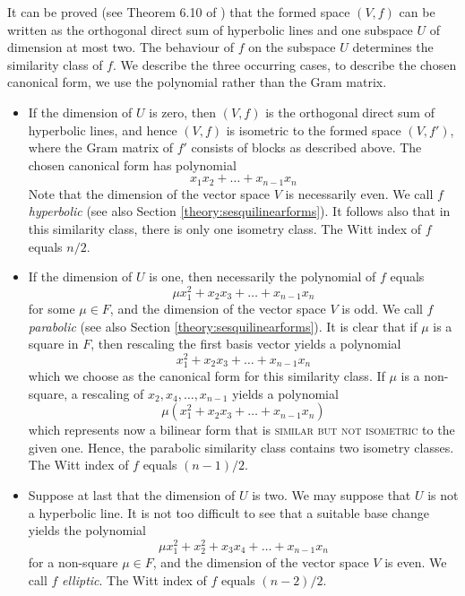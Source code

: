 \documentclass[a4paper,11pt]{report}
\begin{document}
{{{ It can be proved (see Theorem 6.10 of \cite{Cameron}) that the formed space $(V,f)$ can be written as the orthogonal direct sum of hyperbolic lines and one
subspace $U$ of dimension at most two. The behaviour of $f$ on the subspace $U$ determines the similarity class of $f$. We describe the three occurring cases, to describe the chosen canonical
form, we use the polynomial rather than the Gram matrix. 

 
\begin{itemize}
\item If the dimension of $U$ is zero, then $(V,f)$ is the orthogonal direct sum of hyperbolic lines, and hence $(V,f)$ is isometric to the formed space $(V,f')$, where the Gram matrix of $f'$ consists of blocks as described above. The chosen canonical form has
polynomial 
\[ x_1 x_2 + \ldots + x_{n-1}x_n \]
  Note that the dimension of the vector space $V$ is necessarily even. We call $f$ \emph{hyperbolic} (see also Section \ref{theory:sesquilinearforms}). It follows also that in this similarity class, there is only one isometry
class. The Witt index of $f$ equals $n/2$. 
\item If the dimension of $U$ is one, then necessarily the polynomial of $f$ equals 
\[\mu x_1^2 + x_2 x_3 + \ldots + x_{n-1}x_n\]
  for some $\mu \in F$, and the dimension of the vector space $V$ is odd. We call $f$ \emph{parabolic} (see also Section \ref{theory:sesquilinearforms}). It is clear that if $\mu$ is a square in $F$, then rescaling the first basis vector yields a polynomial 
\[x_1^2 + x_2 x_3 + \ldots + x_{n-1}x_n\]
  which we choose as the canonical form for this similarity class. If $\mu$ is a non-square, a rescaling of $x_2,x_4,\ldots,x_{n-1}$  yields a polynomial 
\[\mu (x_1^2 + x_2 x_3 + \ldots + x_{n-1}x_n)\]
  which represents now a bilinear form that is \textsc{similar but not isometric} to the given one. Hence, the parabolic similarity class contains two isometry
classes. The Witt index of $f$ equals $(n-1)/2$. 
\item  Suppose at last that the dimension of $U$ is two. We may suppose that $U$ is not a hyperbolic line. It is not too difficult to see that a suitable base
change yields the polynomial 
\[\mu x_1^2 + x_2^2 + x_3 x_4 + \ldots + x_{n-1}x_n\]
  for a non-square $\mu \in F$, and the dimension of the vector space $V$ is even. We call $f$ \emph{elliptic}. The Witt index of $f$ equals $(n-2)/2$. 
\end{itemize}
 }

 
}}
\end{document}
